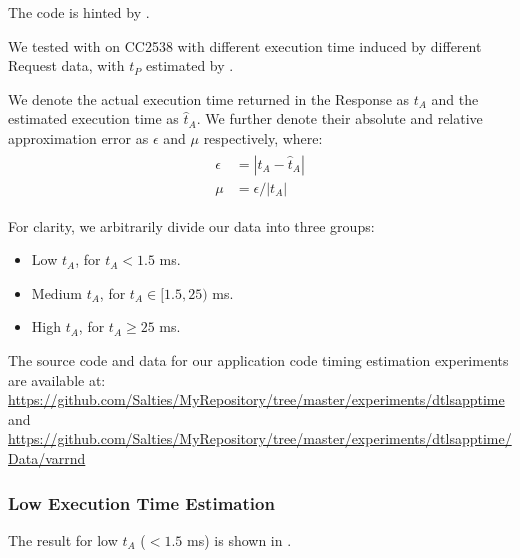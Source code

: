 The code is hinted by .

 

We tested  with  on CC2538 with different execution time induced by different Request data, with $t_P$ estimated by . 

We denote the actual execution time returned in the Response as $t_A$ and the estimated execution time as $\hat{t}_A$. We further denote their absolute and relative approximation error as $\epsilon$ and $\mu$ respectively, where:
\begin{eqnarray}
	\begin{aligned}
		\epsilon	&= |t_A - \hat{t}_A| \\
		\mu 	&= \epsilon / |t_A|
	\end{aligned}
\end{eqnarray}

For clarity, we arbitrarily divide our data into three groups:
\begin{itemize}
	\item Low $t_A$, for $t_A < 1.5$ ms.
	\item Medium $t_A$, for $t_A \in [1.5, 25)$ ms.
	\item High $t_A$, for $t_A \geq 25$ ms.
\end{itemize}

The source code and data for our application code timing estimation experiments are available at: \\
\url{https://github.com/Salties/MyRepository/tree/master/experiments/dtlsapptime} \\
and \\
\url{https://github.com/Salties/MyRepository/tree/master/experiments/dtlsapptime/Data/varrnd}

\subsubsection{Low Execution Time Estimation}

The result for  low $t_A$ ($<1.5$ ms) is shown in .

